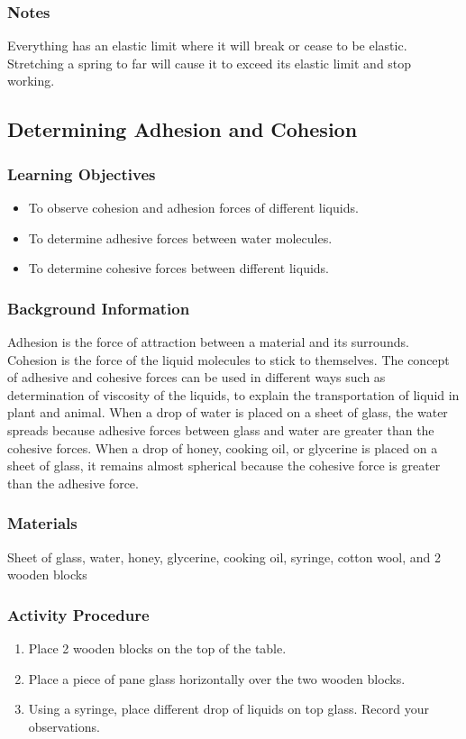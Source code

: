 \subsubsection*{Notes}
Everything has an elastic limit where it will break or cease to be elastic. Stretching a spring to far will cause it to exceed its elastic limit and stop working.

\subsection{Determining Adhesion and Cohesion}

\subsubsection*{Learning Objectives}
\begin{itemize}
\item{To observe cohesion and adhesion forces of different liquids.}
\item{To determine adhesive forces between water molecules.}
\item{To determine cohesive forces between different liquids.}
\end{itemize}

\subsubsection*{Background Information}
Adhesion is the force of attraction between a material and its surrounds. Cohesion is the force of the liquid molecules to stick to themselves. The concept of adhesive and cohesive forces can be used in different ways such as determination of viscosity of the liquids, to explain the transportation of liquid in plant and animal. When a drop of water is placed on a sheet of glass, the water spreads because adhesive forces between glass and water are greater than the cohesive forces. When a drop of honey, cooking oil, or glycerine is placed on a sheet of glass, it remains almost spherical because the cohesive force is greater than the adhesive force.

\subsubsection*{Materials}
Sheet of glass, water, honey, glycerine, cooking oil, syringe, cotton wool, and 2 wooden blocks

\subsubsection*{Activity Procedure}
\begin{enumerate}
\item{Place 2 wooden blocks on the top of the table.}
\item{Place a piece of pane glass horizontally over the two wooden blocks.}
\item{Using a syringe, place different drop of liquids on top glass. Record your observations.}
\end{enumerate}

